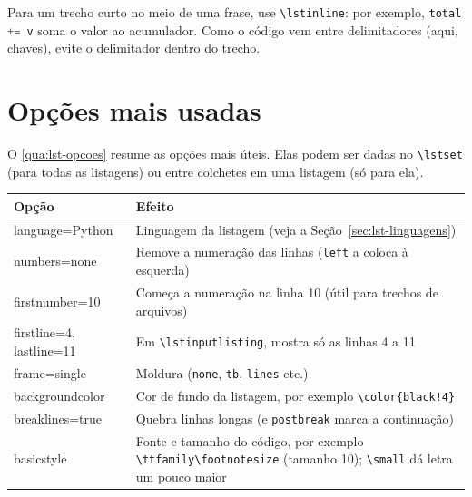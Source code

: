 
Para um trecho curto no meio de uma frase, use \texttt{\textbackslash lstinline}: por
exemplo, \lstinline[language=Python]{total += v} soma o valor ao acumulador. Como o código
vem entre delimitadores (aqui, chaves), evite o delimitador dentro do trecho.

\section{Opções mais usadas}

O \autoref{qua:lst-opcoes} resume as opções mais úteis. Elas podem ser dadas no
\texttt{\textbackslash lstset} (para todas as listagens) ou entre colchetes em uma listagem
(só para ela).

\begin{quadro}[htbp]
\begin{ilustracao}[\linewidth]{\caption[Opções mais usadas do pacote listings]{Opções mais usadas do pacote \texttt{listings}}\label{qua:lst-opcoes}}{\elaboracaopropria}
  \renewcommand{\arraystretch}{1.2}
  \small
  \begin{tabularx}{\linewidth}{|>{\ttfamily\raggedright\arraybackslash}p{4.2cm}|X|}
    \hline
    \textnormal{\textbf{Opção}} & \textbf{Efeito} \\
    \hline
    language=Python & Linguagem da listagem (veja a Seção~\ref{sec:lst-linguagens}) \\
    \hline
    numbers=none & Remove a numeração das linhas (\texttt{left} a coloca à esquerda) \\
    \hline
    firstnumber=10 & Começa a numeração na linha 10 (útil para trechos de arquivos) \\
    \hline
    firstline=4, lastline=11 & Em \texttt{\textbackslash lstinputlisting}, mostra só as linhas 4 a 11 \\
    \hline
    frame=single & Moldura (\texttt{none}, \texttt{tb}, \texttt{lines} etc.) \\
    \hline
    backgroundcolor & Cor de fundo da listagem, por exemplo \texttt{\textbackslash color\{black!4\}} \\
    \hline
    breaklines=true & Quebra linhas longas (e \texttt{postbreak} marca a continuação) \\
    \hline
    basicstyle & Fonte e tamanho do código, por exemplo \texttt{\textbackslash ttfamily\textbackslash footnotesize} (tamanho 10); \texttt{\textbackslash small} dá letra um pouco maior \\

\end{tabularx}
\end{ilustracao}
\end{quadro}
